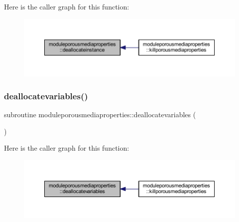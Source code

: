 Here is the caller graph for this function\+:\nopagebreak
\begin{figure}[H]
\begin{center}
\leavevmode
\includegraphics[width=350pt]{namespacemoduleporousmediaproperties_a7002642c0fa8ff01f584386876557fef_icgraph}
\end{center}
\end{figure}
\mbox{\label{namespacemoduleporousmediaproperties_a03075fd748d4630c43019d9d8b5c9b79}} 
\subsubsection{\texorpdfstring{deallocatevariables()}{deallocatevariables()}}
{\footnotesize\ttfamily subroutine moduleporousmediaproperties\+::deallocatevariables (\begin{DoxyParamCaption}{ }\end{DoxyParamCaption})\hspace{0.3cm}{\ttfamily [private]}}

Here is the caller graph for this function\+:\nopagebreak
\begin{figure}[H]
\begin{center}
\leavevmode
\includegraphics[width=350pt]{namespacemoduleporousmediaproperties_a03075fd748d4630c43019d9d8b5c9b79_icgraph}
\end{center}
\end{figure}
\mbox{\label{namespacemoduleporousmediaproperties_a3c5193c49fa27b216424d2162798b41b}} 
